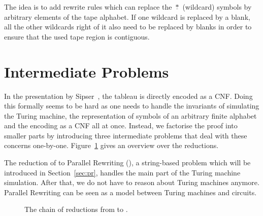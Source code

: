 The idea is to add rewrite rules which can replace the $\underline{*}$ (wildcard) symbols by arbitrary elements of the tape alphabet. If one wildcard is replaced by a blank, all the other wildcards right of it also need to be replaced by blanks in order to ensure that the used tape region is contiguous. 

\section{Intermediate Problems}
In the presentation by Sipser~\cite{Sipser:TheoryofComputation}, the tableau is directly encoded as a CNF. Doing this formally seems to be hard as one needs to handle the invariants of simulating the Turing machine, the representation of symbols of an arbitrary finite alphabet and the encoding as a CNF all at once. 
Instead, we factorise the proof into smaller parts by introducing three intermediate problems that deal with these concerns one-by-one. 
Figure~\ref{fig:redoverview} gives an overview over the reductions.

The reduction of \gennp{} to Parallel Rewriting (\PR{}), a string-based problem which will be introduced in Section~\ref{sec:pr}, handles the main part of the Turing machine simulation. After that, we do not have to reason about Turing machines anymore. 
Parallel Rewriting can be seen as a model between Turing machines and circuits.

\begin{figure}
  \begin{center}
  \end{center}
  \caption{The chain of reductions from \gennp{} to \SAT{}.}\label{fig:redoverview}
\end{figure}


